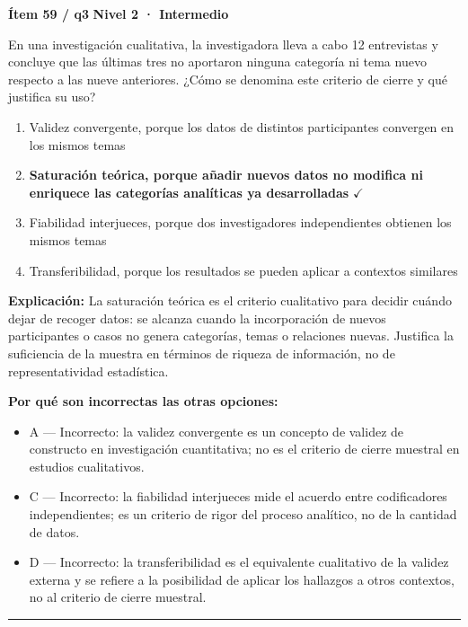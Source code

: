 \documentclass[12pt,a4paper]{article}
\begin{document}
\begin{mdframed}[backgroundcolor=fondogris,linecolor=ambar,linewidth=1pt,innerleftmargin=10pt,innerrightmargin=10pt,innertopmargin=7pt,innerbottommargin=7pt]
\textbf{Ítem 59 / q3} \hfill {\small\bfseries\color{ambar} Nivel 2 · Intermedio}
\end{mdframed}

En una investigación cualitativa, la investigadora lleva a cabo 12 entrevistas y concluye que las últimas tres no aportaron ninguna categoría ni tema nuevo respecto a las nueve anteriores. ¿Cómo se denomina este criterio de cierre y qué justifica su uso?

\begin{enumerate}
  \item[A.] Validez convergente, porque los datos de distintos participantes convergen en los mismos temas
  \item[\textbf{\color{verde}B.}] \textbf{\color{verde} Saturación teórica, porque añadir nuevos datos no modifica ni enriquece las categorías analíticas ya desarrolladas} \hfill $\checkmark$
  \item[C.] Fiabilidad interjueces, porque dos investigadores independientes obtienen los mismos temas
  \item[D.] Transferibilidad, porque los resultados se pueden aplicar a contextos similares
\end{enumerate}

\noindent\textbf{\color{azul}Explicación:} La saturación teórica es el criterio cualitativo para decidir cuándo dejar de recoger datos: se alcanza cuando la incorporación de nuevos participantes o casos no genera categorías, temas o relaciones nuevas. Justifica la suficiencia de la muestra en términos de riqueza de información, no de representatividad estadística.

\noindent\textbf{\color{gris}Por qué son incorrectas las otras opciones:}
\begin{itemize}
  \item {\small A — Incorrecto: la validez convergente es un concepto de validez de constructo en investigación cuantitativa; no es el criterio de cierre muestral en estudios cualitativos.}
  \item {\small C — Incorrecto: la fiabilidad interjueces mide el acuerdo entre codificadores independientes; es un criterio de rigor del proceso analítico, no de la cantidad de datos.}
  \item {\small D — Incorrecto: la transferibilidad es el equivalente cualitativo de la validez externa y se refiere a la posibilidad de aplicar los hallazgos a otros contextos, no al criterio de cierre muestral.}
\end{itemize}
\vspace{8pt}\hrule\vspace{10pt}
\end{document}
